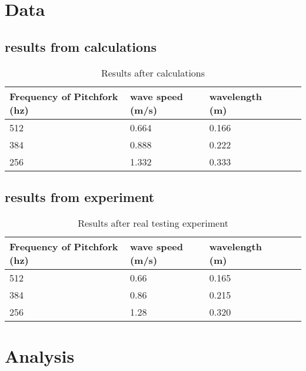 \documentclass{article}
\begin{document}
\section{Data}
\subsection{results from calculations}
\begin{table}[htbp]
\begin{center}
\footnotesize
\begin{tabular}{lllll}
\toprule
 Frequency of Pitchfork (hz)        & wave speed (m/s)         & wavelength   (m)  \\
\midrule
  512   & 0.664        & 0.166 \\
    384   & 0.888         & 0.222   \\
   256  & 1.332        & 0.333    \\
\bottomrule
\end{tabular}
\end{center}
  \caption{Results after calculations}
  \label{tab:font-sizes}
\end{table}

\subsection{results from experiment}
\begin{table}[htbp]
\begin{center}
\footnotesize
\begin{tabular}{lllll}
\toprule
 Frequency of Pitchfork (hz)        & wave speed (m/s)         & wavelength   (m)  \\
\midrule
  512   & 0.66        & 0.165 \\
  384   & 0.86        & 0.215 \\
  256   & 1.28        & 0.320 \\
\bottomrule
\end{tabular}
\end{center}
  \caption{Results after real testing experiment}
  \label{tab:font-sizes}
\end{table}
\newpage
\section{Analysis}
\end{document}
